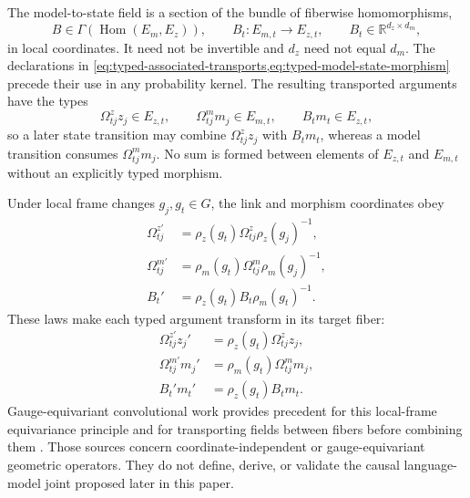 The model-to-state field is a section of the bundle of fiberwise homomorphisms,
\begin{equation}
B\in\Gamma\left(\operatorname{Hom}(E_m,E_z)\right),
\qquad
B_t:E_{m,t}\longrightarrow E_{z,t},
\qquad
B_t\in\mathbb R^{d_z\times d_m},
\label{eq:typed-model-state-morphism}
\end{equation}
in local coordinates.  It need not be invertible and $d_z$ need not equal $d_m$.  The declarations in \cref{eq:typed-associated-transports,eq:typed-model-state-morphism} precede their use in any probability kernel.  The resulting transported arguments have the types
\begin{equation}
\Omega^z_{tj}z_j\in E_{z,t},
\qquad
\Omega^m_{tj}m_j\in E_{m,t},
\qquad
B_tm_t\in E_{z,t},
\label{eq:typed-transported-arguments}
\end{equation}
so a later state transition may combine $\Omega^z_{tj}z_j$ with $B_tm_t$, whereas a model transition consumes $\Omega^m_{tj}m_j$.  No sum is formed between elements of $E_{z,t}$ and $E_{m,t}$ without an explicitly typed morphism.

Under local frame changes $g_j,g_t\in G$, the link and morphism coordinates obey
\begin{equation}
\begin{aligned}
\Omega_{tj}^{z\prime}
&=\rho_z(g_t)\Omega_{tj}^{z}\rho_z(g_j)^{-1},\\
\Omega_{tj}^{m\prime}
&=\rho_m(g_t)\Omega_{tj}^{m}\rho_m(g_j)^{-1},\\
B_t'&=\rho_z(g_t)B_t\rho_m(g_t)^{-1}.
\end{aligned}
\label{eq:link-morphism-gauge-laws}
\end{equation}
These laws make each typed argument transform in its target fiber:
\begin{equation}
\begin{aligned}
\Omega_{tj}^{z\prime}z_j'&=\rho_z(g_t)\Omega^z_{tj}z_j,\\
\Omega_{tj}^{m\prime}m_j'&=\rho_m(g_t)\Omega^m_{tj}m_j,\\
B_t'm_t'&=\rho_z(g_t)B_tm_t.
\end{aligned}
\label{eq:transported-argument-equivariance}
\end{equation}
Gauge-equivariant convolutional work provides precedent for this local-frame equivariance principle and for transporting fields between fibers before combining them \citep{cohen2019gauge,weiler2021coordinate}.  Those sources concern coordinate-independent or gauge-equivariant geometric operators.  They do not define, derive, or validate the causal language-model joint proposed later in this paper.

